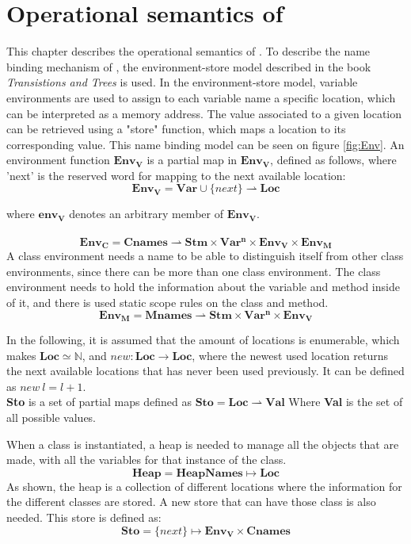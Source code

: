 \section{Operational semantics of \lang{}}
\label{sec:OpSemantics}
This chapter describes the operational semantics of \lang{}. To describe the name binding mechanism of \lang{}, the environment-store model described in the book \textit{Transistions and Trees} \cite{stoloc} is used.
In the environment-store model, variable environments are used to assign to each variable name a specific location, which can be interpreted as a memory address.
The value associated to a given location can be retrieved using a "store" function, which maps a location to its corresponding value. This name binding model can be seen on figure \ref{fig:Env}.
An environment function \(\mathbf{Env_V}\) is a partial map in \(\mathbf{Env_V}\), defined as follows, where 'next' is the reserved word for mapping to the next available location:
\[ \mathbf{Env_V} = \textbf{Var} \cup \{next\} \rightharpoonup \textbf{Loc} \]

where \(\mathbf{env_V}\) denotes an arbitrary member of \(\mathbf{Env_V}\). \\ \\
\[\mathbf{Env_C} = \textbf{Cnames} \rightharpoonup \textbf{Stm} \times \mathbf{Var^n} \times \mathbf{Env_V} \times \mathbf{Env_M}\]
A class environment needs a name to be able to distinguish itself from other class environments, since there can be more than one class environment. The class environment needs to hold the information about the variable and method inside of it, and there is used static scope rules on the class and method.
\[\mathbf{Env_M} = \textbf{Mnames} \rightharpoonup \textbf{Stm} \times \mathbf{Var^n} \times \mathbf{Env_V}\] 



In the following, it is assumed that the amount of locations is enumerable, which makes \(\mathbf{Loc} \simeq \mathbb{N} \), and \(new: \mathbf{Loc} \rightarrow \mathbf{Loc}\), where the newest used location returns  the next available locations that has never been used previously. It can be defined as \(new\ l = l+1\). \\
\textbf{Sto} is a set of partial maps defined as \(\textbf{Sto} = \textbf{Loc} \rightharpoonup \textbf{Val}\)
Where \textbf{Val} is the set of all possible values.

When a class is instantiated, a heap is needed to manage all the objects that are made, with all the variables for that instance of the class. \[\textbf{Heap} = \textbf{HeapNames} \mapsto \textbf{Loc} \] As shown, the heap is a collection of different locations where the information for the different classes are stored. A new store that can have those class is also needed. This store is defined as: \[\textbf{Sto} = \{next\} \mapsto \mathbf{Env_V} \times \textbf{Cnames} \]

